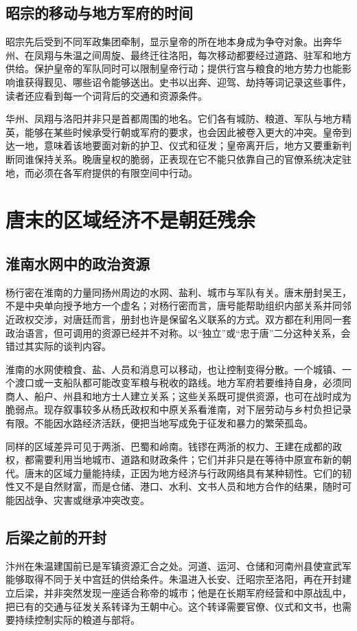 \subsection{昭宗的移动与地方军府的时间}
昭宗先后受到不同军政集团牵制，显示皇帝的所在地本身成为争夺对象。出奔华州、在凤翔与朱温之间周旋、最终迁往洛阳，每次移动都要经过道路、驻军和地方供给。保护皇帝的军队同时可以限制皇帝行动；提供行宫与粮食的地方势力也能影响谁获得觐见、哪些诏令能够送出。史书以出奔、迎驾、劫持等词记录这些事件，读者还应看到每一个词背后的交通和资源条件。

华州、凤翔与洛阳并非只是首都周围的地名。它们各有城防、粮道、军队与地方精英，能够在某些时候承受行朝或军府的要求，也会因此被卷入更大的冲突。皇帝到达一地，意味着该地要面对新的护卫、仪式和征发；皇帝离开后，地方又要重新判断同谁保持关系。晚唐皇权的脆弱，正表现在它不能只依靠自己的官僚系统决定驻地，而必须在各军府提供的有限空间中行动。

\section{唐末的区域经济不是朝廷残余}

\subsection{淮南水网中的政治资源}
杨行密在淮南的力量同扬州周边的水网、盐利、城市与军队有关。唐末册封吴王，不是中央单向授予地方一个虚名；对杨行密而言，唐号能帮助组织内部关系并同邻近政权交涉，对唐廷而言，册封也许是保留名义联系的方式。双方都在利用同一套政治语言，但可调用的资源已经并不对称。以“独立”或“忠于唐”二分这种关系，会错过其实际的谈判内容。

淮南的水网使粮食、盐、人员和消息可以移动，也让控制变得分散。一个城镇、一个渡口或一支船队都可能改变军粮与税收的路线。地方军府若要维持自身，必须同商人、船户、州县和地方士人建立关系；这些关系既可提供资源，也可在战时成为脆弱点。现存叙事较多从杨氏政权和中原关系看淮南，对下层劳动与乡村负担记录有限。不能因水路经济活跃，便把当地写成免于征发和暴力的繁荣孤岛。

同样的区域差异可见于两浙、巴蜀和岭南。钱镠在两浙的权力、王建在成都的政权，都需要利用当地城市、道路和财政条件；它们并非只是在等待中原宣布新的朝代。唐末的区域力量能持续，正因为地方经济与行政网络具有某种韧性。它们的韧性又不是自然财富，而是仓储、港口、水利、文书人员和地方合作的结果，随时可能因战争、灾害或继承冲突改变。

\subsection{后梁之前的开封}
汴州在朱温建国前已是军镇资源汇合之处。河道、运河、仓储和河南州县使宣武军能够取得不同于关中宫廷的供给条件。朱温进入长安、迁昭宗至洛阳，再在开封建立后梁，并非突然发现一座适合称帝的城市；他是在长期军府经营和中原战乱中，把已有的交通与征发关系转译为王朝中心。这个转译需要官僚、仪式和文书，也需要持续控制实际的粮道与部将。

